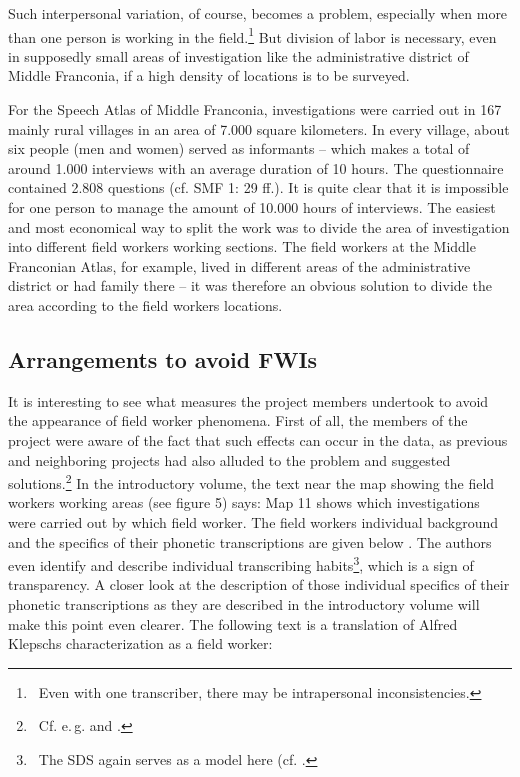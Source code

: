 \documentclass[output=paper]{LSP/langsci}
\begin{document}
Such interpersonal variation, of course, becomes a problem, especially when more than one person is working in the field.\footnote{\ Even with one transcriber, there may be intrapersonal inconsistencies.} But division of labor is necessary, even in supposedly small areas of investigation like the administrative district of Middle Franconia, if a high density of locations is to be surveyed.

For the Speech Atlas of Middle Franconia, investigations were carried out in 167 mainly rural villages in an area of 7.000 square kilometers. In every village, about six people (men and women) served as informants – which makes a total of around 1.000 interviews with an average duration of 10 hours. The questionnaire contained 2.808 questions (cf. SMF 1: 29 ff.). It is quite clear that it is impossible for one person to manage the amount of 10.000 hours of interviews. The easiest and most economical way to split the work was to divide the area of investigation into different field workers{\textquotesingle} working sections. The field workers at the Middle Franconian Atlas, for example, lived in different areas of the administrative district or had family there – it was therefore an obvious solution to divide the area according to the field workers{\textquotesingle} locations.

\subsection{Arrangements to avoid FWIs}
It is interesting to see what measures the project members undertook to avoid the appearance of field worker phenomena. First of all, the members of the project were aware of the fact that such effects can occur in the data, as previous and neighboring projects had also alluded to the problem and suggested solutions.\footnote{\ Cf. e.\,g. \citet[59]{hotzenkocherle_einfuhrung_1962} and \citet[45]{konig_sprachatlas_1997}.} In the introductory volume, the text near the map showing the field workers{\textquotesingle} working areas (see figure 5) says: {\textquotedbl}Map 11 shows which investigations were carried out by which field worker. The field workers{\textquotesingle} individual background and the specifics of their phonetic transcriptions are given below{\textquotedbl} \citep[47]{klepsch_sprachatlas_2013}. The authors even identify and describe individual transcribing habits\footnote{\ The SDS again serves as a model here (cf. \cite[61--73]{hotzenkocherle_einfuhrung_1962}.}, which is a sign of transparency. A closer look at the description of those individual {\textquotedbl}specifics of their phonetic transcriptions{\textquotedbl} as they are described in the introductory volume will make this point even clearer. The following text is a translation of Alfred Klepsch{\textquotesingle}s characterization as a field worker:
\end{document}
